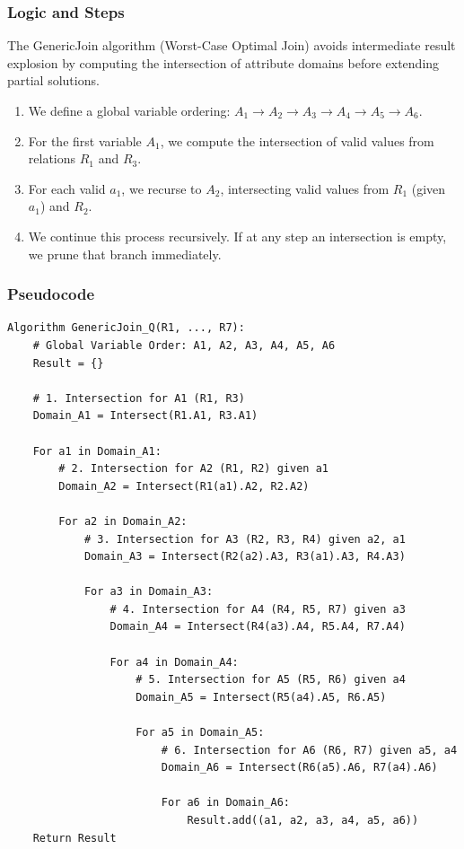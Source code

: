 \documentclass[11pt]{article}
\begin{document}
\subsubsection*{Logic and Steps}
The GenericJoin algorithm (Worst-Case Optimal Join) avoids intermediate result explosion by computing the intersection of attribute domains before extending partial solutions.
\begin{enumerate}
    \item We define a global variable ordering: $A_1 \to A_2 \to A_3 \to A_4 \to A_5 \to A_6$.
    \item For the first variable $A_1$, we compute the intersection of valid values from relations $R_1$ and $R_3$.
    \item For each valid $a_1$, we recurse to $A_2$, intersecting valid values from $R_1$ (given $a_1$) and $R_2$.
    \item We continue this process recursively. If at any step an intersection is empty, we prune that branch immediately.
\end{enumerate}

\subsubsection*{Pseudocode}
\begin{verbatim}
Algorithm GenericJoin_Q(R1, ..., R7):
    # Global Variable Order: A1, A2, A3, A4, A5, A6
    Result = {}
    
    # 1. Intersection for A1 (R1, R3)
    Domain_A1 = Intersect(R1.A1, R3.A1)
    
    For a1 in Domain_A1:
        # 2. Intersection for A2 (R1, R2) given a1
        Domain_A2 = Intersect(R1(a1).A2, R2.A2)
        
        For a2 in Domain_A2:
            # 3. Intersection for A3 (R2, R3, R4) given a2, a1
            Domain_A3 = Intersect(R2(a2).A3, R3(a1).A3, R4.A3)
            
            For a3 in Domain_A3:
                # 4. Intersection for A4 (R4, R5, R7) given a3
                Domain_A4 = Intersect(R4(a3).A4, R5.A4, R7.A4)
                
                For a4 in Domain_A4:
                    # 5. Intersection for A5 (R5, R6) given a4
                    Domain_A5 = Intersect(R5(a4).A5, R6.A5)
                    
                    For a5 in Domain_A5:
                        # 6. Intersection for A6 (R6, R7) given a5, a4
                        Domain_A6 = Intersect(R6(a5).A6, R7(a4).A6)
                        
                        For a6 in Domain_A6:
                            Result.add((a1, a2, a3, a4, a5, a6))
    Return Result
\end{verbatim}
\end{document}
